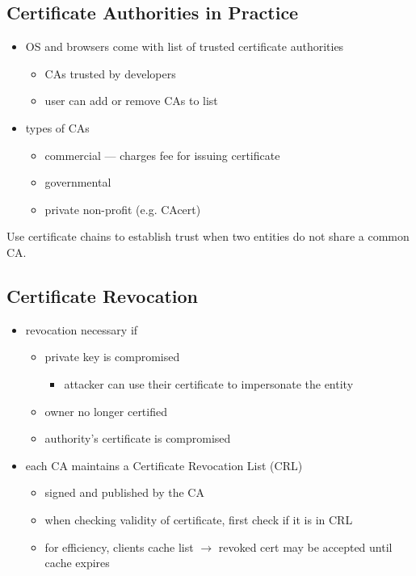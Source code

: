 \documentclass[draft]{article}
\begin{document}
\subsection{Certificate Authorities in Practice}
\begin{itemize}[nosep]
    \item OS and browsers come with list of trusted certificate authorities
          \begin{itemize}[nosep]
              \item CAs trusted by developers
              \item user can add or remove CAs to list
          \end{itemize}
    \item types of CAs
          \begin{itemize}[nosep]
              \item commercial --- charges fee for issuing certificate
              \item governmental
              \item private non-profit (e.g. CAcert)
          \end{itemize}
\end{itemize}
Use certificate chains to establish trust when two entities do not share a common CA.

\subsection{Certificate Revocation}
\begin{itemize}[nosep]
    \item revocation necessary if
          \begin{itemize}[nosep]
              \item private key is compromised
                    \begin{itemize}[nosep]\item attacker can use their certificate to impersonate the entity\end{itemize}
              \item owner no longer certified
              \item authority's certificate is compromised
          \end{itemize}
    \item each CA maintains a Certificate Revocation List (CRL)
          \begin{itemize}[nosep]
              \item signed and published by the CA
              \item when checking validity of certificate, first check if it is in CRL
              \item for efficiency, clients cache list $\rightarrow$ revoked cert may be accepted until cache expires
          \end{itemize}
\end{itemize}
\clearpage

\glsaddall
\printglossary[nonumberlist]
\printglossary[nonumberlist,type=\acronymtype]
\end{document}
